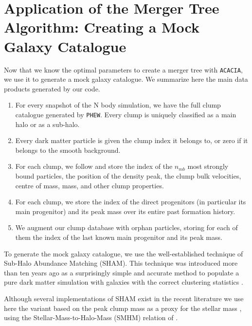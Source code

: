 \section{Application of the Merger Tree Algorithm: Creating a Mock Galaxy Catalogue}
\label{chap:mock_catalogues}

Now that we  know the optimal parameters to create  a merger tree with
\texttt{ACACIA}, we  use it to  generate a mock galaxy  catalogue.  We
summarize here the main data products generated by our code.
\begin{enumerate}
\item For  every snapshot of the  N body simulation, we  have the full
  clump catalogue  generated by \texttt{PHEW}. Every  clump is uniquely
  classified as a main halo or as a sub-halo.
\item Every dark  matter particle is given the clump  index it belongs
  to, or zero if it belongs to the smooth background.
\item For  each clump, we follow  and store the index  of the $n_{mb}$
  most strongly bound particles, the position of the density peak, the
  clump  bulk  velocities,  centre  of mass,  mass,  and  other  clump
  properties.
\item For each clump, we store the index of the direct progenitors (in
  particular its  main progenitor) and  its peak mass over  its entire
  past formation history.
\item We augment our clump database with orphan particles, storing for
  each of  them the index  of the last  known main progenitor  and its
  peak mass.
\end{enumerate}
To generate  the mock  galaxy catalogue,  we use  the well-established
technique of  Sub-Halo Abundance  Matching (SHAM). This  technique was
introduced  more than  ten  years  ago as  a  surprisingly simple  and
accurate  method  to  populate  a pure  dark  matter  simulation  with
galaxies  with the  correct  clustering statistics 
\citep{valeNonparametricModelLinking2006, shankarNewRelationshipsGalaxy2006, 
conroyModelingLuminositydependentGalaxy2006a}.


Although  several   implementations  of  SHAM  exist   in  the  recent
literature \citep{guoHowGalaxiesPopulate2010, 
wetzelWhatDeterminesSatellite2010, 
Moster2010, trujillo-gomezGalaxiesLCDMHalo2011, 
nuzaClusteringGalaxiesSDSSIII2013,
zentnerGalaxyAssemblyBias2014,
chaves-monteroSubhaloAbundanceMatching2016a} we use here  the variant 
based on the peak clump mass as a proxy for the stellar mass
\citep{reddickConnectionGalaxiesDark2013},          using          the
Stellar-Mass-to-Halo-Mass (SMHM) relation of \cite{Behroozi}.


